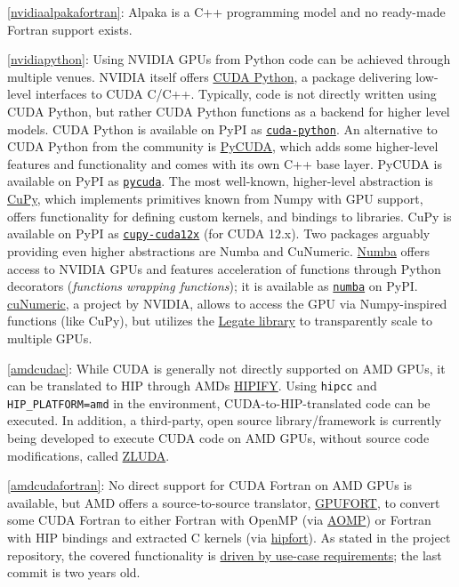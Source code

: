 \item \ref{nvidiaalpakafortran}: Alpaka is a C++ programming model and no ready-made Fortran support exists.
\item \ref{nvidiapython}: Using NVIDIA GPUs from Python code can be achieved through multiple venues. NVIDIA itself offers \href{https://github.com/NVIDIA/cuda-python}{CUDA Python}, a package delivering low-level interfaces to CUDA C/C++. Typically, code is not directly written using CUDA Python, but rather CUDA Python functions as a backend for higher level models. CUDA Python is available on PyPI as \href{https://pypi.org/project/cuda-python/}{\texttt{cuda-python}}. An alternative to CUDA Python from the community is \href{https://github.com/inducer/pycuda}{PyCUDA}, which adds some higher-level features and functionality and comes with its own C++ base layer. PyCUDA is available on PyPI as \href{https://pypi.org/project/pycuda/}{\texttt{pycuda}}. The most well-known, higher-level abstraction is \href{https://cupy.dev/}{CuPy}, which implements primitives known from Numpy with GPU support, offers functionality for defining custom kernels, and bindings to libraries. CuPy is available on PyPI as \href{https://pypi.org/project/cupy-cuda12x/}{\texttt{cupy-cuda12x}} (for CUDA 12.x). Two packages arguably providing even higher abstractions are Numba and CuNumeric. \href{http://numba.pydata.org/}{Numba} offers access to NVIDIA GPUs and features acceleration of functions through Python decorators (\emph{functions wrapping functions}); it is available as \href{https://pypi.org/project/numba/}{\texttt{numba}} on PyPI. \href{https://github.com/nv-legate/cunumeric}{cuNumeric}, a project by NVIDIA, allows to access the GPU via Numpy-inspired functions (like CuPy), but utilizes the \href{https://github.com/nv-legate/legate.core}{Legate library} to transparently scale to multiple GPUs.
\item \ref{amdcudac}: While CUDA is generally not directly supported on AMD GPUs, it can be translated to HIP through AMD\textquotesingle s \href{https://github.com/ROCm-Developer-Tools/HIPIFY}{HIPIFY}. Using \texttt{hipcc} and \texttt{HIP\_PLATFORM=amd} in the environment, CUDA-to-HIP-translated code can be executed. In addition, a third-party, open source library/framework is currently being developed to execute CUDA code on AMD GPUs, without source code modifications, called \href{https://github.com/vosen/ZLUDA}{ZLUDA}.
\item \ref{amdcudafortran}: No direct support for CUDA Fortran on AMD GPUs is available, but AMD offers a source-to-source translator, \href{https://github.com/ROCmSoftwarePlatform/gpufort}{GPUFORT}, to convert some CUDA Fortran to either Fortran with OpenMP (via \href{https://github.com/ROCm-Developer-Tools/aomp}{AOMP}) or Fortran with HIP bindings and extracted C kernels (via \href{https://github.com/ROCmSoftwarePlatform/hipfort}{hipfort}). As stated in the project repository, the covered functionality is \href{https://github.com/ROCmSoftwarePlatform/gpufort\#limitations}{driven by use-case requirements}; the last commit is two years old.
